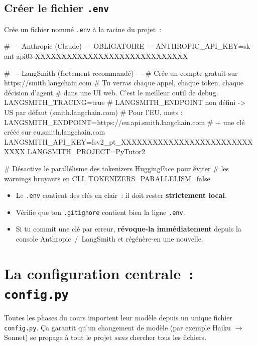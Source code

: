 \documentclass[11pt,a4paper]{article}
\begin{document}
\subsection{Créer le fichier \texttt{.env}}

Crée un fichier nommé \texttt{.env} à la racine du projet~:

\begin{envcode}
# --- Anthropic (Claude) — OBLIGATOIRE ---
ANTHROPIC_API_KEY=sk-ant-api03-XXXXXXXXXXXXXXXXXXXXXXXXXXXXX

# --- LangSmith (fortement recommandé) ---
# Crée un compte gratuit sur https://smith.langchain.com
# Tu verras chaque appel, chaque token, chaque décision d'agent
# dans une UI web. C'est le meilleur outil de debug.
LANGSMITH_TRACING=true
# LANGSMITH_ENDPOINT non défini -> US par défaut (smith.langchain.com)
# Pour l'EU, mets : LANGSMITH_ENDPOINT=https://eu.api.smith.langchain.com
#                   + une clé créée sur eu.smith.langchain.com
LANGSMITH_API_KEY=lsv2_pt_XXXXXXXXXXXXXXXXXXXXXXXXXXXXX
LANGSMITH_PROJECT=PyTutor2

# Désactive le parallélisme des tokenizers HuggingFace pour éviter
# les warnings bruyants en CLI.
TOKENIZERS_PARALLELISM=false
\end{envcode}

\begin{tcolorbox}[title=Sécurité — Ne JAMAIS commiter \texttt{.env}]
\begin{itemize}[leftmargin=*]
  \item Le \texttt{.env} contient des clés en clair~: il doit rester
        \textbf{strictement local}.
  \item Vérifie que ton \texttt{.gitignore} contient bien la ligne
        \texttt{.env}.
  \item Si tu commit une clé par erreur, \textbf{révoque-la
        immédiatement} depuis la console Anthropic~/~LangSmith et
        régénère-en une nouvelle.
\end{itemize}
\end{tcolorbox}

\section{La configuration centrale~: \texttt{config.py}}

Toutes les phases du cours importent leur modèle depuis un unique
fichier \texttt{config.py}. Ça garantit qu'un changement de modèle
(par exemple Haiku $\to$ Sonnet) se propage à tout le projet
\emph{sans} chercher tous les fichiers.
\end{document}
